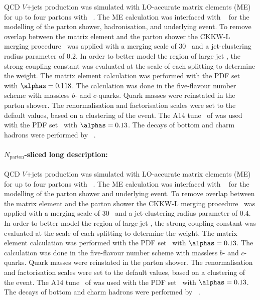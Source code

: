 QCD $V$+jets production was simulated with LO-accurate matrix elements (ME) 
for up to four partons with \MGNLO[2.2.2]~\cite{Alwall:2014hca}. The ME calculation was interfaced with
\PYTHIA[8.186]~\cite{Sjostrand:2007gs} for the modelling of the parton
shower, hadronisation, and underlying event. To remove overlap between the matrix
element and the parton shower the CKKW-L merging
procedure~\cite{Lonnblad:2001iq,Lonnblad:2011xx} was applied with a
merging scale of 30~\GeV{} and a jet-clustering radius parameter of
$0.2$. In order to better model the region of large jet \pt, the
strong coupling constant \alphas was evaluated at the scale of each splitting to
determine the weight. The matrix element calculation was performed with
the \NNPDF[3.0nlo] PDF set~\cite{Ball:2014uwa} with $\alphas= 0.118$. The calculation was done
in the five-flavour number scheme with massless $b$- and
$c$-quarks. Quark masses were reinstated in the \PYTHIA[8] parton shower. 
The renormalisation and factorisation scales were set to the \MADGRAPH default
values, based on a clustering of the event. The A14
tune~\cite{ATL-PHYS-PUB-2014-021} of \PYTHIA[8] was used with the
\NNPDF[2.3lo] PDF set~\cite{Ball:2012cx} with $\alphas=0.13$.  
The decays of bottom and charm hadrons were performed by \EVTGEN[1.2.0]~\cite{Lange:2001uf}.


\paragraph{$N_\text{parton}$-sliced long description:}

QCD $V$+jets production was simulated with LO-accurate matrix elements (ME) for up to four partons with 
\MGNLO[2.2.2]~\cite{Alwall:2014hca}. The ME calculation was interfaced 
with \PYTHIA[8.186]~\cite{Sjostrand:2007gs} for the modelling of the parton
shower and underlying event. To remove overlap between the matrix
element and the parton shower the CKKW-L merging
procedure~\cite{Lonnblad:2001iq,Lonnblad:2011xx} was applied with a
merging scale of 30~\GeV{} and a jet-clustering radius parameter of
$0.4$. In order to better model the region of large jet \pt, the
strong coupling constant \alphas was evaluated at the scale of each splitting to
determine the weight. The matrix element calculation was performed with
the \NNPDF[2.3lo] PDF set~\cite{Ball:2012cx} with $\alphas= 0.13$. The calculation was done
in the five-flavour number scheme with massless $b$- and
$c$-quarks. Quark masses were reinstated in the \PYTHIA[8] parton shower. 
The renormalisation and factorisation scales were set to the \MADGRAPH default
values, based on a clustering of the event. The A14 tune~\cite{ATL-PHYS-PUB-2014-021} 
of \PYTHIA[8] was used with the \NNPDF[2.3lo] PDF set~\cite{Ball:2012cx} with $\alphas=0.13$.  
The decays of bottom and charm hadrons were performed by \EVTGEN[1.2.0]~\cite{Lange:2001uf}.

